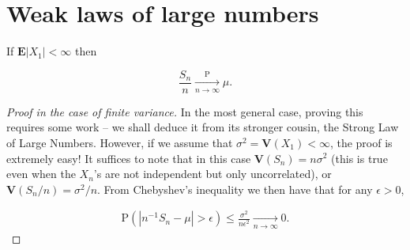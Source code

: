 \section{Weak laws of large numbers}

\begin{thm}
\label{thm-wlln}
If $\mathbf{E}|X_1|<\infty$ then

\[
\frac{S_n}{n} \xrightarrow[n\to\infty]{\mathrm{P}} \mu.
\]

\end{thm}

\begin{proof}[Proof in the case of finite variance]
In the most general case, proving this requires some
work -- we shall deduce it from its stronger cousin,
the Strong Law of Large Numbers. However, if we assume
that $\sigma^2 = \mathbf{V}(X_1)<\infty$, the proof
is extremely easy! It suffices to note that in this
case $\mathbf{V}(S_n) = n \sigma^2$ (this is true
even when the $X_n$'s are not independent but only
uncorrelated), or $\mathbf{V}(S_n/n) = \sigma^2/n$.
From Chebyshev's inequality we then have that for any
$\epsilon>0$,

\begin{align*}
\tag{7}\label{eq:variancebound}
\mathrm{P}(|n^{-1} S_n - \mu|>\epsilon) \le \frac{\sigma^2}{n \epsilon^2} \xrightarrow[n\to\infty]{} 0.
\end{align*}

\end{proof}
